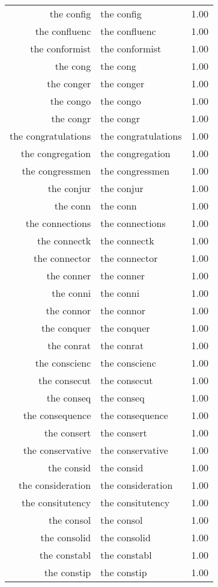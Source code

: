 \begin{table}[ht]
\begin{tabular}{rlr}
  the config & the config & 1.00 \\ 
  the confluenc & the confluenc & 1.00 \\ 
  the conformist & the conformist & 1.00 \\ 
  the cong & the cong & 1.00 \\ 
  the conger & the conger & 1.00 \\ 
  the congo & the congo & 1.00 \\ 
  the congr & the congr & 1.00 \\ 
  the congratulations & the congratulations & 1.00 \\ 
  the congregation & the congregation & 1.00 \\ 
  the congressmen & the congressmen & 1.00 \\ 
  the conjur & the conjur & 1.00 \\ 
  the conn & the conn & 1.00 \\ 
  the connections & the connections & 1.00 \\ 
  the connectk & the connectk & 1.00 \\ 
  the connector & the connector & 1.00 \\ 
  the conner & the conner & 1.00 \\ 
  the conni & the conni & 1.00 \\ 
  the connor & the connor & 1.00 \\ 
  the conquer & the conquer & 1.00 \\ 
  the conrat & the conrat & 1.00 \\ 
  the conscienc & the conscienc & 1.00 \\ 
  the consecut & the consecut & 1.00 \\ 
  the conseq & the conseq & 1.00 \\ 
  the consequence & the consequence & 1.00 \\ 
  the consert & the consert & 1.00 \\ 
  the conservative & the conservative & 1.00 \\ 
  the consid & the consid & 1.00 \\ 
  the consideration & the consideration & 1.00 \\ 
  the consitutency & the consitutency & 1.00 \\ 
  the consol & the consol & 1.00 \\ 
  the consolid & the consolid & 1.00 \\ 
  the constabl & the constabl & 1.00 \\ 
  the constip & the constip & 1.00 \\ 

\end{tabular}
\end{table}

